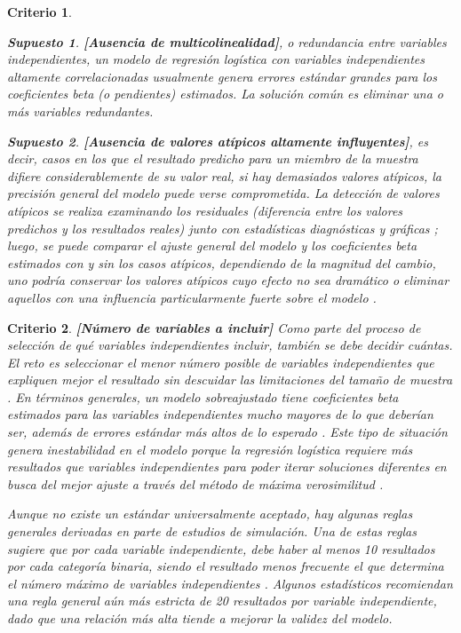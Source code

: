 \documentclass[12pt]{article}
\newtheorem{Criterio}{Criterio}%
\newtheorem{Sup}{Supuesto}%
\begin{document}
\begin{Criterio}
\begin{Sup} \textbf{[Ausencia de multicolinealidad]}, o redundancia entre variables independientes,  un modelo de regresi\'on log\'istica con variables independientes altamente correlacionadas usualmente genera errores est\'andar grandes para los coeficientes beta (o pendientes) estimados. La soluci\'on com\'un es eliminar una o m\'as variables redundantes.\cite{tabachnick2007}
\end{Sup}

\begin{Sup} \textbf{[Ausencia de valores at\'ipicos altamente influyentes]}, es decir, casos en los que el resultado predicho para un miembro de la muestra difiere considerablemente de su valor real, si hay demasiados valores at\'ipicos, la precisi\'on general del modelo puede verse comprometida. La detecci\'on de valores at\'ipicos se realiza examinando los residuales (diferencia entre los valores predichos y los resultados reales) junto con estad\'isticas diagn\'osticas y gr\'aficas \cite{tabachnick2007,hosmer2000}; luego, se puede comparar el ajuste general del modelo y los coeficientes beta estimados con y sin los casos at\'ipicos, dependiendo de la magnitud del cambio, uno podr\'ia conservar los valores at\'ipicos cuyo efecto no sea dram\'atico\cite{hosmer2000} o eliminar aquellos con una influencia particularmente fuerte sobre el modelo \cite{tabachnick2007,hosmer2000}.
\end{Sup}
\end{Criterio}

\begin{Criterio} \textbf{[N\'umero de variables a incluir]} Como parte del proceso de selecci\'on de qu\'e variables independientes incluir, tambi\'en se debe decidir cu\'antas. El reto es seleccionar el menor n\'umero posible de variables independientes que expliquen mejor el resultado sin descuidar las limitaciones del tama\~no de muestra \cite{tabachnick2007,hosmer2000}. En t\'erminos generales, un modelo sobreajustado tiene coeficientes beta estimados para las variables independientes mucho mayores de lo que deber\'ian ser, adem\'as de errores est\'andar m\'as altos de lo esperado \cite{hosmer2000}. Este tipo de situaci\'on genera inestabilidad en el modelo porque la regresi\'on log\'istica requiere m\'as resultados que variables independientes para poder iterar soluciones diferentes en busca del mejor ajuste a trav\'es del m\'etodo de m\'axima verosimilitud \cite{tabachnick2007,hosmer2000}.

Aunque no existe un est\'andar universalmente aceptado, hay algunas \textit{reglas generales} derivadas en parte de estudios de simulaci\'on. Una de estas reglas sugiere que por cada variable independiente, debe haber al menos 10 resultados por cada categor\'ia binaria, siendo el resultado menos frecuente el que determina el n\'umero m\'aximo de variables independientes \cite{peduzzi1996, agresti2007}. Algunos estad\'isticos recomiendan una \textit{regla general} a\'un m\'as estricta de 20 resultados por variable independiente, dado que una relaci\'on m\'as alta tiende a mejorar la validez del modelo\cite{feinstein1996}. 
\end{Criterio}
\end{document}

